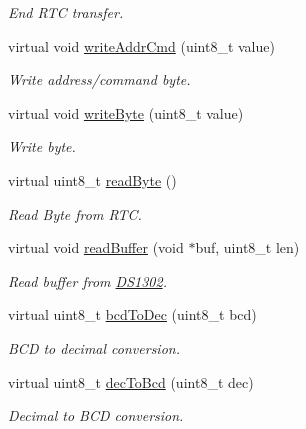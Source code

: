 \begin{DoxyCompactItemize}
\begin{DoxyCompactList}\small\item\em End R\+TC transfer. \end{DoxyCompactList}\item 
virtual void \hyperlink{class_d_s1302_a96a8e9adc377002676073f7a962baa75}{write\+Addr\+Cmd} (uint8\+\_\+t value)
\begin{DoxyCompactList}\small\item\em Write address/command byte. \end{DoxyCompactList}\item 
virtual void \hyperlink{class_d_s1302_a622660d97d7309e5f2be3d48d2157b56}{write\+Byte} (uint8\+\_\+t value)
\begin{DoxyCompactList}\small\item\em Write byte. \end{DoxyCompactList}\item 
virtual uint8\+\_\+t \hyperlink{class_d_s1302_aa505de55e1cd5605417de24917d820d5}{read\+Byte} ()
\begin{DoxyCompactList}\small\item\em Read Byte from R\+TC. \end{DoxyCompactList}\item 
virtual void \hyperlink{class_d_s1302_ae21054c896c91e8b92496945ad50d930}{read\+Buffer} (void $\ast$buf, uint8\+\_\+t len)
\begin{DoxyCompactList}\small\item\em Read buffer from \hyperlink{class_d_s1302}{D\+S1302}. \end{DoxyCompactList}\item 
virtual uint8\+\_\+t \hyperlink{class_d_s1302_ac9d7e091afa27d4689ecd0c709841839}{bcd\+To\+Dec} (uint8\+\_\+t bcd)
\begin{DoxyCompactList}\small\item\em B\+CD to decimal conversion. \end{DoxyCompactList}\item 
virtual uint8\+\_\+t \hyperlink{class_d_s1302_a916547c2828a476e52977fc507c12c84}{dec\+To\+Bcd} (uint8\+\_\+t dec)
\begin{DoxyCompactList}\small\item\em Decimal to B\+CD conversion. \end{DoxyCompactList}\end{DoxyCompactItemize}
